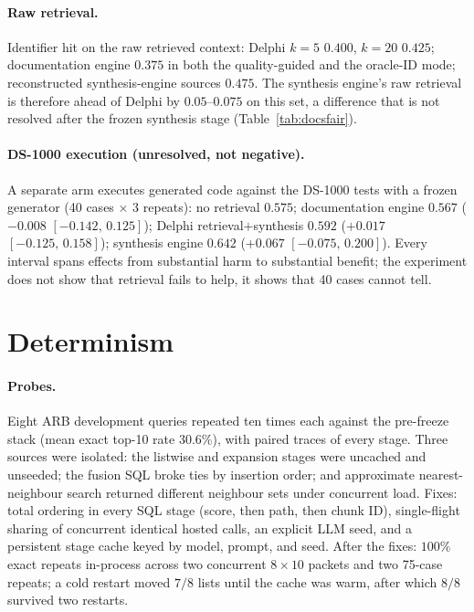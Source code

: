 \documentclass{article}
\newcommand{\ci}[2]{{\footnotesize$[#1,\,#2]$}}
\newcommand{\system}{Delphi}
\begin{document}
\begin{table}[h]
\centering
\caption{Engine-versus-engine paired differences under the matched contract (case-cluster bootstrap $95\%$ intervals; wins/losses/ties over 40 cases). Every interval includes zero.}
\label{tab:docspairs}
\small
\resizebox{\textwidth}{!}{}
\end{table}

\paragraph{Raw retrieval.} Identifier hit on the raw retrieved context: \system{} $k{=}5$ $0.400$, $k{=}20$ $0.425$; documentation engine $0.375$ in both the quality-guided and the oracle-ID mode; reconstructed synthesis-engine sources $0.475$. The synthesis engine's raw retrieval is therefore ahead of \system{} by $0.05$--$0.075$ on this set, a difference that is not resolved after the frozen synthesis stage (Table~\ref{tab:docsfair}).

\paragraph{DS-1000 execution (unresolved, not negative).} A separate arm executes generated code against the DS-1000 tests with a frozen generator (40 cases $\times$ 3 repeats): no retrieval $0.575$; documentation engine $0.567$ ($-0.008$ \ci{-0.142}{0.125}); \system{} retrieval$+$synthesis $0.592$ ($+0.017$ \ci{-0.125}{0.158}); synthesis engine $0.642$ ($+0.067$ \ci{-0.075}{0.200}). Every interval spans effects from substantial harm to substantial benefit; the experiment does not show that retrieval fails to help, it shows that 40 cases cannot tell.

\section{Determinism}
\label{app:determinism}

\paragraph{Probes.} Eight ARB development queries repeated ten times each against the pre-freeze stack (mean exact top-10 rate $30.6\%$), with paired traces of every stage. Three sources were isolated: the listwise and expansion stages were uncached and unseeded; the fusion SQL broke ties by insertion order; and approximate nearest-neighbour search returned different neighbour sets under concurrent load. Fixes: total ordering in every SQL stage (score, then path, then chunk ID), single-flight sharing of concurrent identical hosted calls, an explicit LLM seed, and a persistent stage cache keyed by model, prompt, and seed. After the fixes: $100\%$ exact repeats in-process across two concurrent $8\times10$ packets and two 75-case repeats; a cold restart moved $7/8$ lists until the cache was warm, after which $8/8$ survived two restarts.
\end{document}
